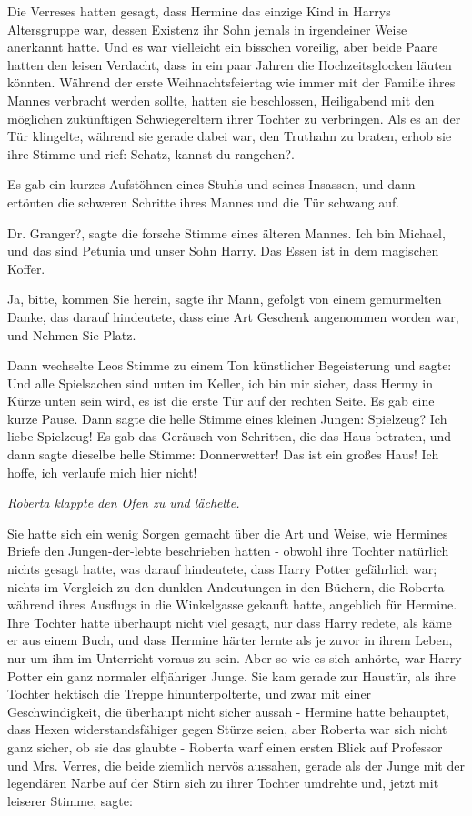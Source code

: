 Die Verreses hatten gesagt, dass Hermine das einzige Kind in Harrys Altersgruppe
war, dessen Existenz ihr Sohn jemals in irgendeiner Weise anerkannt hatte. Und
es war vielleicht ein bisschen voreilig, aber beide Paare hatten den leisen
Verdacht, dass in ein paar Jahren die Hochzeitsglocken läuten könnten. Während
der erste Weihnachtsfeiertag wie immer mit der Familie ihres Mannes verbracht
werden sollte, hatten sie beschlossen, Heiligabend mit den möglichen zukünftigen
Schwiegereltern ihrer Tochter zu verbringen. Als es an der Tür klingelte,
während sie gerade dabei war, den Truthahn zu braten, erhob sie ihre Stimme und
rief: \glqq{}Schatz, kannst du rangehen?\grqq{}.

Es gab ein kurzes Aufstöhnen eines Stuhls und seines Insassen, und dann ertönten
die schweren Schritte ihres Mannes und die Tür schwang auf.

\glqq{}Dr. Granger?\grqq{}, sagte die forsche Stimme eines älteren Mannes. \glqq{}
Ich bin Michael, und das sind Petunia und unser Sohn Harry. Das Essen ist in dem
magischen Koffer.\grqq{}

\glqq{}Ja, bitte, kommen Sie herein\grqq{}, sagte ihr Mann, gefolgt von einem
gemurmelten \glqq{}Danke\grqq{}, das darauf hindeutete, dass eine Art Geschenk
angenommen worden war, und \glqq{}Nehmen Sie Platz.\grqq{}

Dann wechselte Leos Stimme zu einem Ton künstlicher Begeisterung und sagte:
\glqq{}Und alle Spielsachen sind unten im Keller, ich bin mir sicher, dass Hermy
in Kürze unten sein wird, es ist die erste Tür auf der rechten Seite.\grqq{} Es gab
eine kurze Pause. Dann sagte die helle Stimme eines kleinen Jungen: \glqq{}
Spielzeug? Ich liebe Spielzeug!\grqq{} Es gab das Geräusch von Schritten, die das Haus
betraten, und dann sagte dieselbe helle Stimme: \glqq{}Donnerwetter! Das ist ein
großes Haus! Ich hoffe, ich verlaufe mich hier nicht!\grqq{}

\emph{Roberta klappte den Ofen zu und lächelte.}

Sie hatte sich ein wenig Sorgen gemacht über die Art und Weise, wie Hermines
Briefe den Jungen-der-lebte beschrieben hatten - obwohl ihre Tochter natürlich
nichts gesagt hatte, was darauf hindeutete, dass Harry Potter gefährlich war;
nichts im Vergleich zu den dunklen Andeutungen in den Büchern, die Roberta
während ihres Ausflugs in die Winkelgasse gekauft hatte, angeblich für Hermine.
Ihre Tochter hatte überhaupt nicht viel gesagt, nur dass Harry redete, als käme
er aus einem Buch, und dass Hermine härter lernte als je zuvor in ihrem Leben,
nur um ihm im Unterricht voraus zu sein. Aber so wie es sich anhörte, war Harry
Potter ein ganz normaler elfjähriger Junge. Sie kam gerade zur Haustür, als ihre
Tochter hektisch die Treppe hinunterpolterte, und zwar mit einer
Geschwindigkeit, die überhaupt nicht sicher aussah - Hermine hatte behauptet,
dass Hexen widerstandsfähiger gegen Stürze seien, aber Roberta war sich nicht
ganz sicher, ob sie das glaubte - Roberta warf einen ersten Blick auf Professor
und Mrs. Verres, die beide ziemlich nervös aussahen, gerade als der Junge mit
der legendären Narbe auf der Stirn sich zu ihrer Tochter umdrehte und, jetzt mit
leiserer Stimme, sagte:


